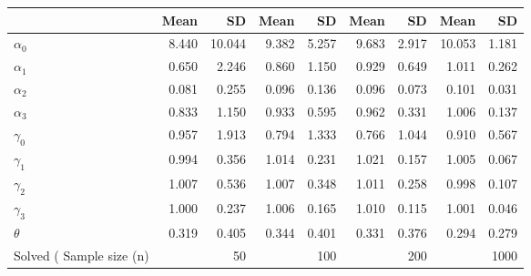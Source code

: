 
\begin{tabular}[t]{lrrrrrrrr}
\toprule
  & Mean & SD & Mean  & SD  & Mean   & SD   & Mean    & SD   \\
\midrule
$\alpha_{0}$ & 8.440 & 10.044 & 9.382 & 5.257 & 9.683 & 2.917 & 10.053 & 1.181\\
$\alpha_{1}$ & 0.650 & 2.246 & 0.860 & 1.150 & 0.929 & 0.649 & 1.011 & 0.262\\
$\alpha_{2}$ & 0.081 & 0.255 & 0.096 & 0.136 & 0.096 & 0.073 & 0.101 & 0.031\\
$\alpha_{3}$ & 0.833 & 1.150 & 0.933 & 0.595 & 0.962 & 0.331 & 1.006 & 0.137\\
$\gamma_{0}$ & 0.957 & 1.913 & 0.794 & 1.333 & 0.766 & 1.044 & 0.910 & 0.567\\
$\gamma_{1}$ & 0.994 & 0.356 & 1.014 & 0.231 & 1.021 & 0.157 & 1.005 & 0.067\\
$\gamma_{2}$ & 1.007 & 0.536 & 1.007 & 0.348 & 1.011 & 0.258 & 0.998 & 0.107\\
$\gamma_{3}$ & 1.000 & 0.237 & 1.006 & 0.165 & 1.010 & 0.115 & 1.001 & 0.046\\
$\theta$ & 0.319 & 0.405 & 0.344 & 0.401 & 0.331 & 0.376 & 0.294 & 0.279\\
Solved (%
Sample size (n) &  & 50 &  & 100 &  & 200 &  & 1000\\
\bottomrule
\end{tabular}
